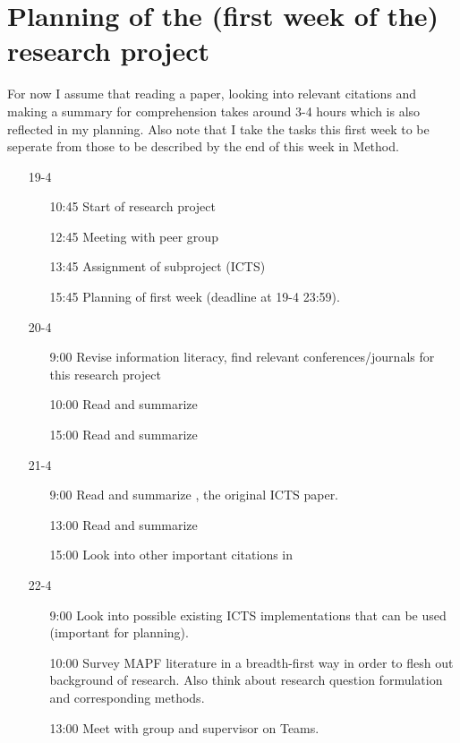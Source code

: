 \documentclass[a4paper,10pt,english]{article}
\begin{document}
\section*{Planning of the (first week of the) research project} 
For now I assume that reading a paper, looking into relevant citations and making a summary for comprehension takes around 3-4 hours which is also reflected in my planning. Also note that I take the tasks this first week to be seperate from those to be described by the end of this week in Method.
\begin{enumerate}
	\item[19-4 ] 
	\begin{enumerate}
		\item[10:45] Start of research project
		\item[12:45] Meeting with peer group
		\item[13:45] Assignment of subproject (ICTS)
		\item[15:45] Planning of first week (deadline at 19-4 23:59).
	\end{enumerate}
	\item[20-4] 
	\begin{enumerate}
	\item[9:00] Revise information literacy, find relevant conferences/journals for this research project
	\item[10:00] Read and summarize \cite{stern2019}
	\item[15:00] Read and summarize \cite{mulderij2020}
	\end{enumerate}
	\item[21-4]
		\begin{enumerate}
		\item[9:00] Read and summarize \cite{sharon2011}, the original ICTS paper.
		\item[13:00] Read and summarize \cite{standley2010}
		\item[15:00] Look into other important citations in \cite{sharon2011}
	\end{enumerate}
	\item[22-4] \begin{enumerate}
		\item[9:00] Look into possible existing ICTS implementations that can be used (important for planning).
		\item[10:00] Survey MAPF literature in a breadth-first way in order to flesh out background of research. Also think about research question formulation and corresponding methods.
		\item[13:00] Meet with group and supervisor on Teams.

\end{enumerate}
\end{enumerate}
\end{document}
